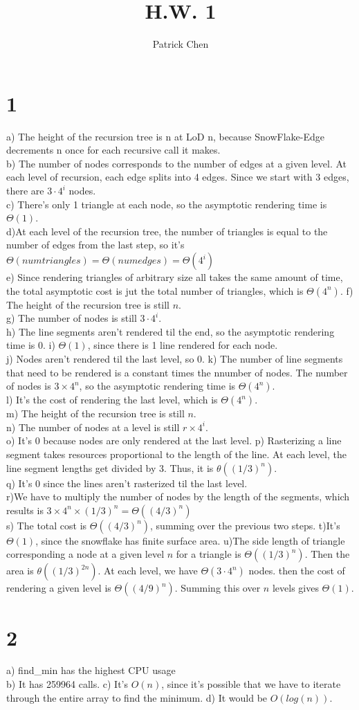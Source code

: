 \documentclass[10pt,a4paper]{article}
\title{H.W. 1}
\author{Patrick Chen}
\begin{document}
\maketitle
\tableofcontents
\section{1}
a) 
The height of the recursion tree is n at LoD n, because SnowFlake-Edge decrements n once for each recursive call it makes. \\
b) The number of nodes corresponds to the number of edges at a given level. At each level of recursion, each edge splits into 4 edges. Since we start with 3 edges, there are $3 \cdot 4^i$ nodes.\\
c) There's only 1 triangle at each node, so the asymptotic rendering time is $\Theta(1)$.\\
d)At each level of the recursion tree, the number of triangles is equal to the number of edges from the last step, so it's 
$\Theta(num triangles)=\Theta(num edges)=\Theta(4^i)$\\
e) Since rendering triangles of arbitrary size all takes the same amount of time, the total asymptotic cost is jut the total number of triangles, which is $\Theta(4^n)$.
f) The height of the recursion tree is still $n$.\\
g) The number of nodes is still $3 \cdot 4^i$.\\
h) The line segments aren't rendered til the end, so the asymptotic rendering time is $0$.
i) $\Theta(1)$, since there is 1 line rendered for each node. \\
j) Nodes aren't rendered til the last level, so $0$.
k) The number of line segments that need to be rendered is a constant times the nnumber of nodes. The number of nodes is $3 \times 4^n$, so the asymptotic rendering time is $\Theta(4^n)$. \\
l) It's the cost of rendering the last level, which is $\Theta(4^n)$.\\
m) The height of the recursion tree is still $n$.\\
n) The number of nodes at a level is still $r \times 4^i$. \\
o) It's $0$ because nodes are only rendered at the last level.
p) Rasterizing a line segment takes resources proportional to the length of the line. At each level, the line segment lengths get divided by 3. Thus, it is $\theta((1/3)^n)$.\\
q)  It's $0$ since the lines aren't rasterized til the last level.\\
r)We have to multiply the number of nodes by the length of the segments, which results is $3 \times 4^n \times (1/3)^n= \Theta((4/3)^n)$ \\
s) The total cost is $\Theta((4/3)^n)$, summing over the previous two steps.
t)It's $\Theta(1)$, since the snowflake has finite surface area.
u)The side length of triangle corresponding a node at a given level $n$ for a triangle is $\Theta((1/3)^n)$. Then the area is $\theta((1/3)^{2n})$. At each level, we have $\Theta(3 \cdot 4^n)$ nodes. then the cost of rendering a given level is $\Theta((4/9)^n)$. Summing this over $n$ levels gives $\Theta(1)$.
\section{2}
a) find_min has the highest CPU usage\\
b) It has 259964 calls.
c) It's $O(n)$, since it's possible that we have to iterate through the entire array to find the minimum.
d) It would be $O(log(n))$.
\end{document}
